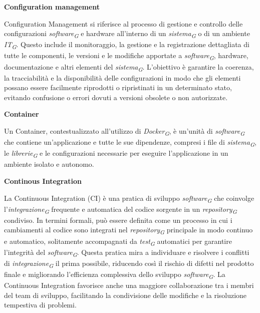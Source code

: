 \documentclass{article}
\begin{document}
\vspace{0.4cm}

\textbf{Configuration management}

\vspace{0.1cm}

Configuration Management si riferisce al processo di gestione e controllo delle configurazioni \textit{software}\textsubscript{\textit{G}} e hardware all'interno di un \textit{sistema}\textsubscript{\textit{G}} o di un ambiente \textit{IT}\textsubscript{\textit{G}}. Questo include il monitoraggio, la gestione e la registrazione dettagliata di tutte le componenti, le versioni e le modifiche apportate a \textit{software}\textsubscript{\textit{G}}, hardware, documentazione e altri elementi del \textit{sistema}\textsubscript{\textit{G}}. L'obiettivo è garantire la coerenza, la tracciabilità e la disponibilità delle configurazioni in modo che gli elementi possano essere facilmente riprodotti o ripristinati in un determinato stato, evitando confusione o errori dovuti a versioni obsolete o non autorizzate.

\vspace{0.4cm}

\textbf{Container}

\vspace{0.1cm}

Un Container, contestualizzato all’utilizzo di \textit{Docker}\textsubscript{\textit{G}}, è un'unità di \textit{software}\textsubscript{\textit{G}} che contiene un'applicazione e tutte le sue dipendenze, compresi i file di \textit{sistema}\textsubscript{\textit{G}}, le \textit{librerie}\textsubscript{\textit{G}} e le configurazioni necessarie per eseguire l'applicazione in un ambiente isolato e autonomo.

\vspace{0.4cm}

\textbf{Continous Integration}

\vspace{0.1cm}

La Continuous Integration (CI) è una pratica di sviluppo \textit{software}\textsubscript{\textit{G}} che coinvolge l'\textit{integrazione}\textsubscript{\textit{G}} frequente e automatica del codice sorgente in un \textit{repository}\textsubscript{\textit{G}} condiviso. In termini formali, può essere definita come un processo in cui i cambiamenti al codice sono integrati nel \textit{repository}\textsubscript{\textit{G}} principale in modo continuo e automatico, solitamente accompagnati da \textit{test}\textsubscript{\textit{G}} automatici per garantire l'integrità del \textit{software}\textsubscript{\textit{G}}. Questa pratica mira a individuare e risolvere i conflitti di \textit{integrazione}\textsubscript{\textit{G}} il prima possibile, riducendo così il rischio di difetti nel prodotto finale e migliorando l'efficienza complessiva dello sviluppo \textit{software}\textsubscript{\textit{G}}. La Continuous Integration favorisce anche una maggiore collaborazione tra i membri del team di sviluppo, facilitando la condivisione delle modifiche e la risoluzione tempestiva di problemi.
\end{document}
